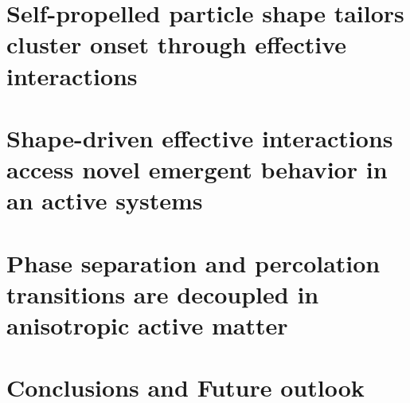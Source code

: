 \documentclass[reqno,12pt,oneside]{report}  %
\begin{document}
\chapter{Self-propelled particle shape tailors cluster onset through effective interactions}
\label{ch:active-shapes}


\chapter{Shape-driven effective interactions access novel emergent behavior in an active systems}
\label{ch:binary-shapes}


\chapter{Phase separation and percolation transitions are decoupled in anisotropic active matter}
\label{ch:percolation}


\chapter{Conclusions and Future outlook}
\label{ch:conclusions}


%


\startbibliography
\begin{singlespace} %
\end{singlespace}

%
\end{document}
